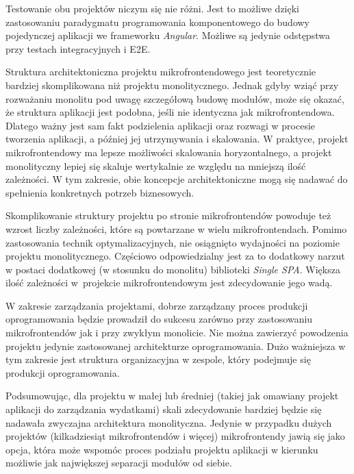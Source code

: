 \documentclass{SGGW-thesis}
\begin{document}
Testowanie obu projektów niczym się nie różni. Jest to możliwe dzięki zastosowaniu paradygmatu programowania komponentowego do budowy pojedynczej aplikacji we frameworku \textit{Angular}. Możliwe są jedynie odstępstwa przy testach integracyjnych i E2E.

Struktura architektoniczna projektu mikrofrontendowego jest teoretycznie bardziej skomplikowana niż projektu monolitycznego. Jednak gdyby wziąć przy rozważaniu monolitu pod uwagę szczegółową budowę modułów, może się okazać, że struktura aplikacji jest podobna, jeśli nie identyczna jak mikrofrontendowa. Dlatego ważny jest sam fakt podzielenia aplikacji oraz rozwagi w procesie tworzenia aplikacji, a później jej utrzymywania i skalowania. W praktyce, projekt mikrofrontendowy ma lepsze możliwości skalowania horyzontalnego, a projekt monolityczny lepiej się skaluje wertykalnie ze względu na mniejszą ilość zależności. W tym zakresie, obie koncepcje architektoniczne mogą się nadawać do spełnienia konkretnych potrzeb biznesowych.

Skomplikowanie struktury projektu po stronie mikrofrontendów powoduje też wzrost liczby zależności, które są powtarzane w wielu mikrofrontendach. Pomimo zastosowania technik optymalizacyjnych, nie osiągnięto wydajności na poziomie projektu monolitycznego. Częściowo odpowiedzialny jest za to dodatkowy narzut w postaci dodatkowej (w stosunku do monolitu) biblioteki \textit{Single SPA}. Większa ilość zależności w~projekcie mikrofrontendowym jest zdecydowanie jego wadą.

W zakresie zarządzania projektami, dobrze zarządzany proces produkcji oprogramowania będzie prowadził do sukcesu zarówno przy zastosowaniu mikrofrontendów jak i przy zwykłym monolicie. Nie można zawierzyć powodzenia projektu jedynie zastosowanej architekturze oprogramowania. Dużo ważniejsza w tym zakresie jest struktura organizacyjna w zespole, który podejmuje się produkcji oprogramowania.

Podsumowując, dla projektu w małej lub średniej (takiej jak omawiany projekt aplikacji do zarządzania wydatkami) skali zdecydowanie bardziej będzie się nadawała zwyczajna architektura monolityczna. Jedynie w przypadku dużych projektów (kilkadziesiąt mikrofrontendów i więcej) mikrofrontendy jawią się jako opcja, która może wspomóc proces podziału projektu aplikacji w kierunku możliwie jak największej separacji modułów od siebie.



\printbibliography[heading=bibnumbered,title={Bibliografia}]



\beforelastpage
\end{document}
